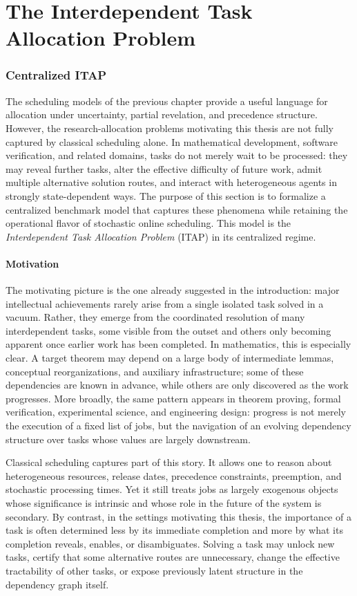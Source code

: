 \chapter{The Interdependent Task Allocation Problem}\label{chap:task_allocation}

\subsection{Centralized ITAP}

The scheduling models of the previous chapter provide a useful language for allocation under uncertainty, partial revelation, and precedence structure. However, the research-allocation problems motivating this thesis are not fully captured by classical scheduling alone. In mathematical development, software verification, and related domains, tasks do not merely wait to be processed: they may reveal further tasks, alter the effective difficulty of future work, admit multiple alternative solution routes, and interact with heterogeneous agents in strongly state-dependent ways. The purpose of this section is to formalize a centralized benchmark model that captures these phenomena while retaining the operational flavor of stochastic online scheduling. This model is the \emph{Interdependent Task Allocation Problem} (ITAP) in its centralized regime.

\subsubsection{Motivation}

The motivating picture is the one already suggested in the introduction: major intellectual achievements rarely arise from a single isolated task solved in a vacuum. Rather, they emerge from the coordinated resolution of many interdependent tasks, some visible from the outset and others only becoming apparent once earlier work has been completed. In mathematics, this is especially clear. A target theorem may depend on a large body of intermediate lemmas, conceptual reorganizations, and auxiliary infrastructure; some of these dependencies are known in advance, while others are only discovered as the work progresses. More broadly, the same pattern appears in theorem proving, formal verification, experimental science, and engineering design: progress is not merely the execution of a fixed list of jobs, but the navigation of an evolving dependency structure over tasks whose values are largely downstream.

Classical scheduling captures part of this story. It allows one to reason about heterogeneous resources, release dates, precedence constraints, preemption, and stochastic processing times. Yet it still treats jobs as largely exogenous objects whose significance is intrinsic and whose role in the future of the system is secondary. By contrast, in the settings motivating this thesis, the importance of a task is often determined less by its immediate completion and more by what its completion reveals, enables, or disambiguates. Solving a task may unlock new tasks, certify that some alternative routes are unnecessary, change the effective tractability of other tasks, or expose previously latent structure in the dependency graph itself.


